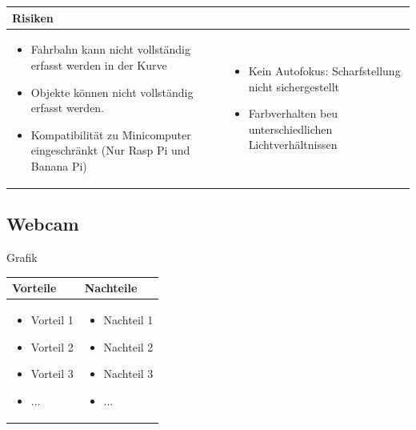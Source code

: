 \begin{table}[h]
\begin{tabular}{p{}p{}}


 \textbf{Risiken} & \\ \hline
	 
\begin{itemize}
\item Fahrbahn kann nicht vollständig erfasst werden in der Kurve
\item Objekte können nicht vollständig erfasst werden.
\item Kompatibilität zu Minicomputer eingeschränkt (Nur Rasp Pi und Banana Pi)
\end{itemize}
&
\begin{itemize}
\item Kein Autofokus: Scharfstellung nicht sichergestellt
\item Farbverhalten beu unterschiedlichen Lichtverhältnissen 
\end{itemize}

 
\end{tabular}
\end{table}

\pagebreak


\subsection{Webcam}
Grafik

\begin{table}[h]
\begin{tabular}{p{} | p{}}


 \textbf{Vorteile} & \textbf{Nachteile} \\ \hline
	 
\begin{itemize}
\item Vorteil 1
\item Vorteil 2
\item Vorteil 3
\item ...
\end{itemize}

 
 &
 
\begin{itemize}
\item Nachteil 1
\item Nachteil 2
\item Nachteil 3
\item ...
\end{itemize}

\end{tabular}
\end{table}

